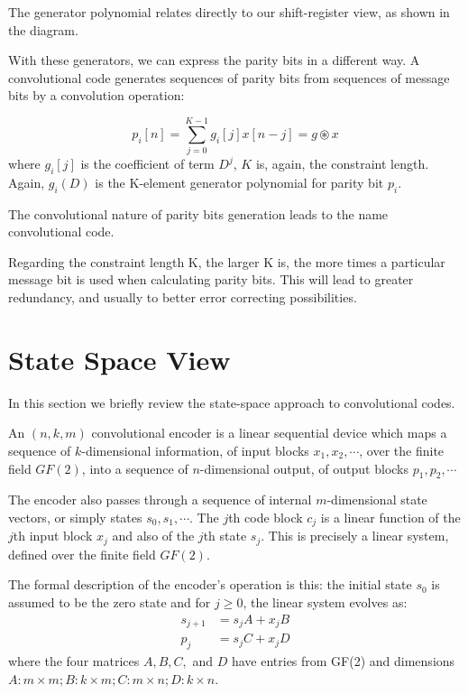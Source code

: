 The generator polynomial  relates directly to our shift-register view, as shown in  the diagram. 


With these generators, we can express the parity bits in a different way.  A convolutional code generates sequences of parity bits from
sequences of message bits by a convolution operation:

   \[p_i[n] = \sum_{j=0}^{K-1} g_i[j] x[n-j] = g \circledast x\]
where \(g_i[j]\) is the coefficient of term $D^j$,  
$K$ is, again, the constraint length. Again, \(g_i(D)\) is the K-element generator polynomial for parity bit \(p_i\).

The convolutional nature of parity bits generation leads to the name convolutional code. 

Regarding the constraint length K, the larger K is,
the more times a particular message bit is used when calculating parity bits.  This will lead to greater redundancy, and usually to better error correcting possibilities.



\section{State Space View}
In this section we briefly review the state-space approach to convolutional codes.

An \((n, k, m)\) convolutional encoder is a linear sequential device which maps a sequence of $k$-dimensional information, of input blocks \(x_1, x_2, \cdots\), over the finite field \(GF(2)\),  into a sequence of $n$-dimensional output, of output blocks \(p_1, p_2, \cdots\)

The encoder also passes through a sequence of internal $m$-dimensional state vectors, or simply states \(s_0 , s_1, \cdots\). The $j$th code block \(c_j\) is a linear function of the $j$th input block \(x_j\) and also of the $j$th state \(s_j\). This is precisely a linear system, defined over the finite field \(GF(2)\).


The formal description of the encoder’s operation is  this: the initial state \(s_0\) is assumed to be the zero state and for \(j \geq 0\), the linear system evolves as:
\begin{align}
 s_{j+1} &= s_j A + x_j B  \label{eq:state} \\
 p_j &= s_j C + x_j D \label{eq:output}
\end{align}
where the four matrices \(A, B, C,\) and \(D\) have entries from GF(2) and dimensions \(A:m \times m; B:k \times m; C:m \times n; D : k \times n\).


